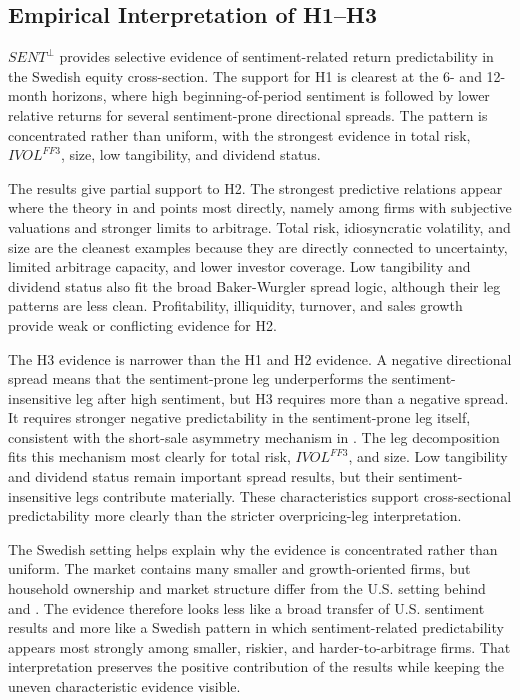\documentclass[11pt]{article}
\newcommand{\var}[1]{\ensuremath{#1}}
\begin{document}
\subsection{Empirical Interpretation of H1--H3}
\var{SENT^{\perp}} provides selective evidence of sentiment-related return predictability in the Swedish equity cross-section. The support for H1 is clearest at the 6- and 12-month horizons, where high beginning-of-period sentiment is followed by lower relative returns for several sentiment-prone directional spreads. The pattern is concentrated rather than uniform, with the strongest evidence in total risk, \var{IVOL^{FF3}}, size, low tangibility, and dividend status.

The results give partial support to H2. The strongest predictive relations appear where the theory in \citet{baker2006sentiment} and \citet{baker2007} points most directly, namely among firms with subjective valuations and stronger limits to arbitrage. Total risk, idiosyncratic volatility, and size are the cleanest examples because they are directly connected to uncertainty, limited arbitrage capacity, and lower investor coverage. Low tangibility and dividend status also fit the broad Baker-Wurgler spread logic, although their leg patterns are less clean. Profitability, illiquidity, turnover, and sales growth provide weak or conflicting evidence for H2.

The H3 evidence is narrower than the H1 and H2 evidence. A negative directional spread means that the sentiment-prone leg underperforms the sentiment-insensitive leg after high sentiment, but H3 requires more than a negative spread. It requires stronger negative predictability in the sentiment-prone leg itself, consistent with the short-sale asymmetry mechanism in \citet{stambaugh2012short}. The leg decomposition fits this mechanism most clearly for total risk, \var{IVOL^{FF3}}, and size. Low tangibility and dividend status remain important spread results, but their sentiment-insensitive legs contribute materially. These characteristics support cross-sectional predictability more clearly than the stricter overpricing-leg interpretation.

The Swedish setting helps explain why the evidence is concentrated rather than uniform. The market contains many smaller and growth-oriented firms, but household ownership and market structure differ from the U.S. setting behind \citet{baker2006sentiment} and \citet{stambaugh2012short}. The evidence therefore looks less like a broad transfer of U.S. sentiment results and more like a Swedish pattern in which sentiment-related predictability appears most strongly among smaller, riskier, and harder-to-arbitrage firms. That interpretation preserves the positive contribution of the results while keeping the uneven characteristic evidence visible.
\end{document}
